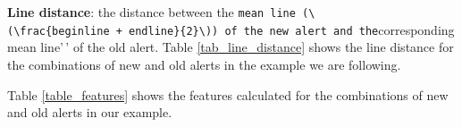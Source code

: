 \documentclass[
]{article}
\begin{document}
\noindent \textbf{Line distance}: the distance between the
\texttt{mean\ line\textquotesingle{}\textquotesingle{}\ (\textbackslash{}(\textbackslash{}frac\{beginline\ +\ endline\}\{2\}\textbackslash{}))\ of\ the\ new\ alert\ and\ the}corresponding
mean line'\,' of the old alert. Table \ref{tab_line_distance} shows the
line distance for the combinations of new and old alerts in the example
we are following.

\small

\begin{table}[H]

\caption{\label{tab:unnamed-chunk-12}Line distance feature \label{tab_line_distance}}
\centering
{}
\end{table}

\normalsize

Table \ref{table_features} shows the features calculated for the
combinations of new and old alerts in our example.

\small
\end{document}
